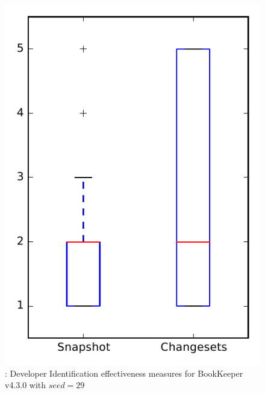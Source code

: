 
\begin{figure}
\centering
\includegraphics[height=0.4\textheight]{figures/dit_seed/rq1_bookkeeper_29}
\caption{\rtwo: Developer Identification effectiveness measures for BookKeeper v4.3.0 with $seed=29$}
\label{fig:dit_seed:rq1:bookkeeper}
\end{figure}

